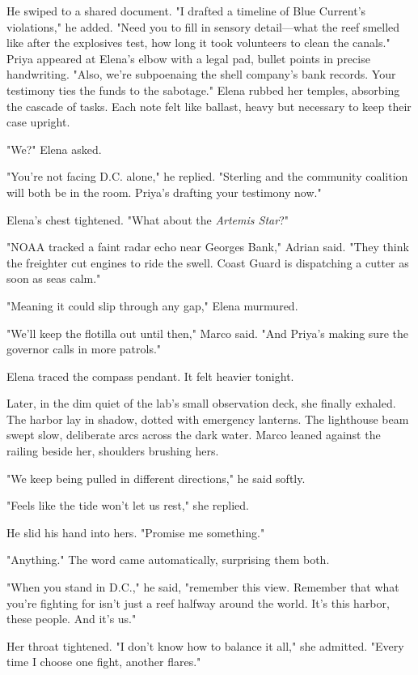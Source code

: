 He swiped to a shared document. "I drafted a timeline of Blue Current's violations," he added. "Need you to fill in sensory detail—what the reef smelled like after the explosives test, how long it took volunteers to clean the canals." Priya appeared at Elena's elbow with a legal pad, bullet points in precise handwriting. "Also, we're subpoenaing the shell company's bank records. Your testimony ties the funds to the sabotage." Elena rubbed her temples, absorbing the cascade of tasks. Each note felt like ballast, heavy but necessary to keep their case upright.

"We?" Elena asked.

"You're not facing D.C. alone," he replied. "Sterling and the community coalition will both be in the room. Priya's drafting your testimony now."

Elena's chest tightened. "What about the \textit{Artemis Star}?"

"NOAA tracked a faint radar echo near Georges Bank," Adrian said. "They think the freighter cut engines to ride the swell. Coast Guard is dispatching a cutter as soon as seas calm."

"Meaning it could slip through any gap," Elena murmured.

"We'll keep the flotilla out until then," Marco said. "And Priya's making sure the governor calls in more patrols."

Elena traced the compass pendant. It felt heavier tonight.

\bigskip

Later, in the dim quiet of the lab's small observation deck, she finally exhaled. The harbor lay in shadow, dotted with emergency lanterns. The lighthouse beam swept slow, deliberate arcs across the dark water. Marco leaned against the railing beside her, shoulders brushing hers.

"We keep being pulled in different directions," he said softly.

"Feels like the tide won't let us rest," she replied.

He slid his hand into hers. "Promise me something."

"Anything." The word came automatically, surprising them both.

"When you stand in D.C.," he said, "remember this view. Remember that what you're fighting for isn't just a reef halfway around the world. It's this harbor, these people. And it's us."

Her throat tightened. "I don't know how to balance it all," she admitted. "Every time I choose one fight, another flares."

